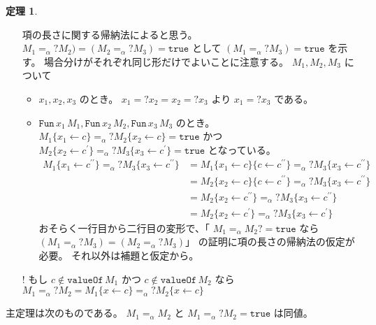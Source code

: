 \documentclass[dvipdfmx]{jsarticle}
\theoremstyle{definition}
\newtheorem*{theorem}{定理}
\begin{document}
\begin{theorem}
\begin{itemize}
      項の長さに関する帰納法によると思う。
      \(M_1 =_{\alpha}? M_2) = (M_2 =_{\alpha}? M_3) = \texttt{true}\) として \((M_1 =_{\alpha}? M_3) = \texttt{true} \) を示す。
      場合分けがそれぞれ同じ形だけでよいことに注意する。
      \(M_1 , M_2 , M_3\) について
      \begin{itemize}
      \item 
        \(x_1 , x_2 , x_3\) のとき。
        \(x_1 =? x_2 = x_2 =? x_3\) より \(x_1 =? x_3\) である。
      \item
        \(\texttt{Fun} \, x_1 \, M_1 , \texttt{Fun} \, x_2 \, M_2 , \texttt{Fun} \, x_3 \, M_3\) のとき。
        \(M_1\{x_1 \leftarrow c\} =_{\alpha}? M_2\{x_2 \leftarrow c\} = \texttt{true}\) かつ \(M_2\{x_2 \leftarrow c^{\prime}\} =_{\alpha}? M_3\{x_3 \leftarrow c^{\prime}\} = \texttt{true}\) となっている。
        \begin{align*}
          M_1\{x_1 \leftarrow c^{\prime \prime}\} =_{\alpha}? M_3\{x_3 \leftarrow c^{\prime \prime}\}
          &= M_1\{x_1 \leftarrow c\}\{c \leftarrow c^{\prime \prime}\} =_{\alpha}? M_3\{x_3 \leftarrow c^{\prime \prime}\} \\
          &= M_2\{x_2 \leftarrow c\}\{c \leftarrow c^{\prime \prime}\} =_{\alpha}? M_3\{x_3 \leftarrow c^{\prime \prime}\} \\
          &= M_2\{x_2 \leftarrow c^{\prime \prime}\} =_{\alpha}? M_3\{x_3 \leftarrow c^{\prime \prime}\} \\
          &= M_2\{x_2 \leftarrow c^{\prime}\} =_{\alpha}? M_3\{x_3 \leftarrow c^{\prime}\}
        \end{align*}
        おそらく一行目から二行目の変形で、「 \(M_1 =_{\alpha} M_2? = \texttt{true}\) なら \((M_1 =_{\alpha}? M_3) = (M_2 =_{\alpha}? M_3)\)」 の証明に項の長さの帰納法の仮定が必要。
        それ以外は補題と仮定から。
      \end{itemize}
    \item[!]
      もし \(c \notin \texttt{valueOf} \, M_1\) かつ \(c \notin \texttt{valueOf} \, M_2\) なら \(M_1 =_{\alpha}? M_2 = M_1\{x \leftarrow c\} =_{\alpha}? M_2\{x \leftarrow c\}\)
  \end{itemize}
  主定理は次のものである。
  \(M_1 =_{\alpha} M_2\) と \(M_1 =_{\alpha}? M_2 = \texttt{true}\) は同値。
\end{theorem}
\end{document}
